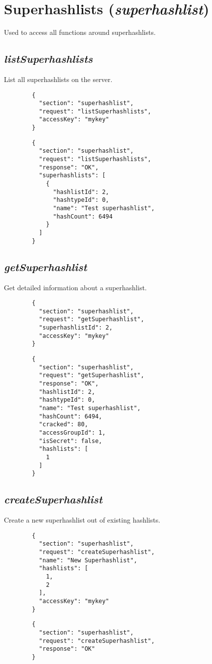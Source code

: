 \section*{Superhashlists (\textit{superhashlist})}
	Used to access all functions around superhashlists.
	
\subsection*{\textit{listSuperhashlists}}
	List all superhashlists on the server.
	{
		\color{blue}
		\begin{verbatim}
		{
		  "section": "superhashlist",
		  "request": "listSuperhashlists",
		  "accessKey": "mykey"
		}
		\end{verbatim}
	}
	{
		\color{OliveGreen}
		\begin{verbatim}
		{
		  "section": "superhashlist",
		  "request": "listSuperhashlists",
		  "response": "OK",
		  "superhashlists": [
		    {
		      "hashlistId": 2,
		      "hashtypeId": 0,
		      "name": "Test superhashlist",
		      "hashCount": 6494
		    }
		  ]
		}
		\end{verbatim}
	}
\subsection*{\textit{getSuperhashlist}}
	Get detailed information about a superhashlist.
	{
		\color{blue}
		\begin{verbatim}
		{
		  "section": "superhashlist",
		  "request": "getSuperhashlist",
		  "superhashlistId": 2,
		  "accessKey": "mykey"
		}
		\end{verbatim}
	}
	{
		\color{OliveGreen}
		\begin{verbatim}
		{
		  "section": "superhashlist",
		  "request": "getSuperhashlist",
		  "response": "OK",
		  "hashlistId": 2,
		  "hashtypeId": 0,
		  "name": "Test superhashlist",
		  "hashCount": 6494,
		  "cracked": 80,
		  "accessGroupId": 1,
		  "isSecret": false,
		  "hashlists": [
		    1
		  ]
		}
		\end{verbatim}
	}
\subsection*{\textit{createSuperhashlist}}
	Create a new superhashlist out of existing hashlists.
	{
		\color{blue}
		\begin{verbatim}
		{
		  "section": "superhashlist",
		  "request": "createSuperhashlist",
		  "name": "New Superhashlist",
		  "hashlists": [
		    1,
		    2
		  ],
		  "accessKey": "mykey"
		}
		\end{verbatim}
	}
	{
		\color{OliveGreen}
		\begin{verbatim}
		{
		  "section": "superhashlist",
		  "request": "createSuperhashlist",
		  "response": "OK"
		}
		\end{verbatim}
	}
